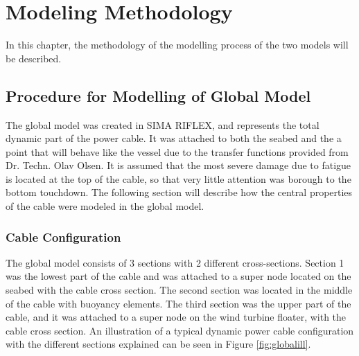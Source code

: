 \chapter{Modeling Methodology}
\label{chap:procedure}
In this chapter, the methodology of the modelling process of the two models will be described.
\section{Procedure for Modelling of Global Model}
\label{sec:globmod}
The global model was created in SIMA RIFLEX, and represents the total dynamic part of the power cable. It was attached to both the seabed and the a point that will behave like the vessel due to the transfer functions provided from Dr. Techn. Olav Olsen. It is assumed that the most severe damage due to fatigue is located at the top of the cable, so that very little attention was borough to the bottom touchdown. The following section will describe how the central properties of the cable were modeled in the global model. 

\subsection{Cable Configuration}
The global model consists of 3 sections with 2 different cross-sections. Section 1 was the lowest part of the cable and was attached to a super node located on the seabed with the cable cross section. The second section was located in the middle of the cable with buoyancy elements. The third section was the upper part of the cable, and it was attached to a super node on the wind turbine floater, with the cable cross section. An illustration of a typical dynamic power cable configuration with the different sections explained can be seen in Figure \ref{fig:globalill}.\newline
\newline 

